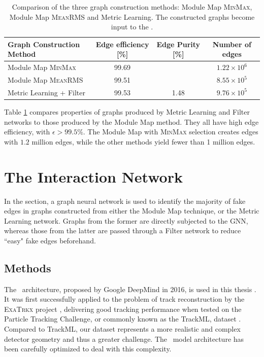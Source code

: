 \begin{table}[h!]
    \centering
    \begin{tabular}{l|c|c|c}
      Graph Construction Method  & Edge efficiency [\%] & Edge Purity [\%] & Number of edges  \\
      \hline \hline
        Module Map {\textsc{MinMax}} & 99.69 & & $1.22\times 10^6$ \\
        Module Map {\textsc{MeanRMS}} & 99.51  & & $8.55\times 10^5$ \\
        Metric Learning + Filter & 99.53  & 1.48 & $9.76\times 10^5$\\
        \hline
    \end{tabular}
    \caption{Comparison of the three graph construction methods: Module Map \textsc{MinMax}, Module Map \textsc{MeanRMS} and Metric Learning. 
    The constructed graphs become input to the \ignn.}
    \label{tab:graph-contruction-comparison}
\end{table}

Table \ref{tab:graph-contruction-comparison} compares properties of graphs produced by Metric Learning and Filter networks to those produced by the Module Map method. 
They all have high edge efficiency, with $\epsilon> 99.5\%$. 
The Module Map with \textsc{MinMax} selection creates edges with $1.2$ million edges, while the other methods yield fewer than 1 million edges. 

\section{The Interaction Network}
\label{sect:ignn}

In the section, a graph neural network is used to identify the majority of fake edges in graphs constructed from either the Module Map technique, or the Metric Learning network.
Graphs from the former are directly subjected to the GNN, whereas those from the latter are passed through a Filter network to reduce ``easy" fake edges beforehand.

\subsection{Methods}

The \ignn~architecture, proposed by Google DeepMind in 2016, 
is used in this thesis \cite{interaction-gnn}. 
It was first successfully applied to the problem of track reconstruction by the \textsc{ExaTrkx} project \cite{exatrkx}, delivering good tracking performance when tested on the Particle Tracking Challenge, or commonly known as the TrackML, dataset \cite{trackml-particle-identification}.
Compared to TrackML, our dataset represents a more realistic and complex detector geometry and thus a greater challenge. 
The \ignn~model architecture has been carefully optimized to deal with this complexity. 


